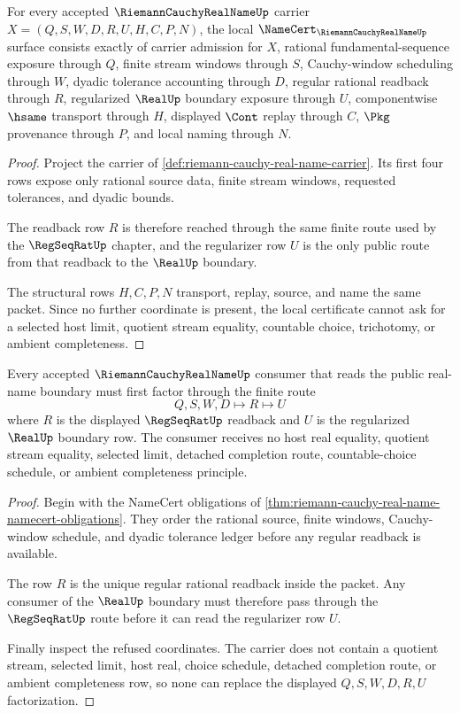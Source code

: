 \begin{theorem}
\label{thm:riemann-cauchy-real-name-namecert-obligations}
For every accepted $\RiemannCauchyRealNameUp$ carrier $X=(Q,S,W,D,R,U,H,C,P,N)$, the local $\NameCert_{\RiemannCauchyRealNameUp}$ surface consists exactly of carrier admission for $X$, rational fundamental-sequence exposure through $Q$, finite stream windows through $S$, Cauchy-window scheduling through $W$, dyadic tolerance accounting through $D$, regular rational readback through $R$, regularized $\RealUp$ boundary exposure through $U$, componentwise $\hsame$ transport through $H$, displayed $\Cont$ replay through $C$, $\Pkg$ provenance through $P$, and local naming through $N$.
\end{theorem}
\begin{proof}
Project the carrier of \autoref{def:riemann-cauchy-real-name-carrier}. Its first four rows expose only rational source data, finite stream windows, requested tolerances, and dyadic bounds.

The readback row $R$ is therefore reached through the same finite route used by the $\RegSeqRatUp$ chapter, and the regularizer row $U$ is the only public route from that readback to the $\RealUp$ boundary.

The structural rows $H,C,P,N$ transport, replay, source, and name the same packet. Since no further coordinate is present, the local certificate cannot ask for a selected host limit, quotient stream equality, countable choice, trichotomy, or ambient completeness.
\end{proof}

\begin{theorem}
\label{thm:riemann-cauchy-real-name-regseqrat-factorization}
Every accepted $\RiemannCauchyRealNameUp$ consumer that reads the public real-name boundary must first factor through the finite route
$$
Q,S,W,D \longmapsto R \longmapsto U
$$
where $R$ is the displayed $\RegSeqRatUp$ readback and $U$ is the regularized $\RealUp$ boundary row. The consumer receives no host real equality, quotient stream equality, selected limit, detached completion route, countable-choice schedule, or ambient completeness principle.
\end{theorem}
\begin{proof}
Begin with the NameCert obligations of \autoref{thm:riemann-cauchy-real-name-namecert-obligations}. They order the rational source, finite windows, Cauchy-window schedule, and dyadic tolerance ledger before any regular readback is available.

The row $R$ is the unique regular rational readback inside the packet. Any consumer of the $\RealUp$ boundary must therefore pass through the $\RegSeqRatUp$ route before it can read the regularizer row $U$.

Finally inspect the refused coordinates. The carrier does not contain a quotient stream, selected limit, host real, choice schedule, detached completion route, or ambient completeness row, so none can replace the displayed $Q,S,W,D,R,U$ factorization.
\end{proof}

